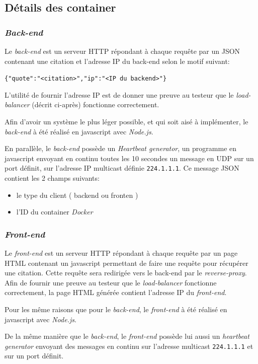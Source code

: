 \documentclass[a4paper,11pt,titlepage]{article}
\begin{document}
\subsection{Détails des container}
\subsubsection{\emph{Back-end}}
Le \emph{back-end} est un serveur HTTP répondant à chaque requête par un JSON contenant une citation et
l'adresse IP du back-end selon le motif suivant:
\begin{center}
\texttt{\{"quote":"<citation>","ip":"<IP du backend>"\}}
\end{center}
L'utilité de fournir l'adresse IP est de donner une preuve au testeur que le \emph{load-balancer} (décrit ci-après)
fonctionne correctement.

Afin d'avoir un système le plus léger possible, et qui soit aisé à implémenter, le \emph{back-end} à été réalisé en
javascript avec \emph{Node.js}.

En parallèle, le \emph{back-end} possède un \emph{Heartbeat generator}, un programme en javascript envoyant en continu
toutes les 10 secondes un message en UDP sur un port définit, sur l'adresse IP multicast définie \texttt{224.1.1.1}.
Ce message JSON contient les 2 champs suivants:

\begin{itemize}
	\item le type du client ( backend ou fronten ) 
	\item l'ID du container \emph{Docker}
\end{itemize}

\subsubsection{\emph{Front-end}}
Le \emph{front-end} est un serveur HTTP répondant à chaque requête par un page HTML contenant un javascript permettant
de faire une requête pour récupérer une citation. Cette requête sera redirigée vers le back-end par le
\emph{reverse-proxy}. Afin de fournir une preuve au testeur que le \emph{load-balancer} fonctionne correctement, la page
HTML générée contient l'adresse IP du \emph{front-end}.

Pour les même raisons que pour le \emph{back-end}, le \emph{front-end} à été réalisé en javascript avec \emph{Node.js}.

De la même manière que le \emph{back-end}, le \emph{front-end} possède lui aussi un \emph{heartbeat generator} envoyant
des messages en continu sur l'adresse multicast \texttt{224.1.1.1} et sur un port définit.
\end{document}
